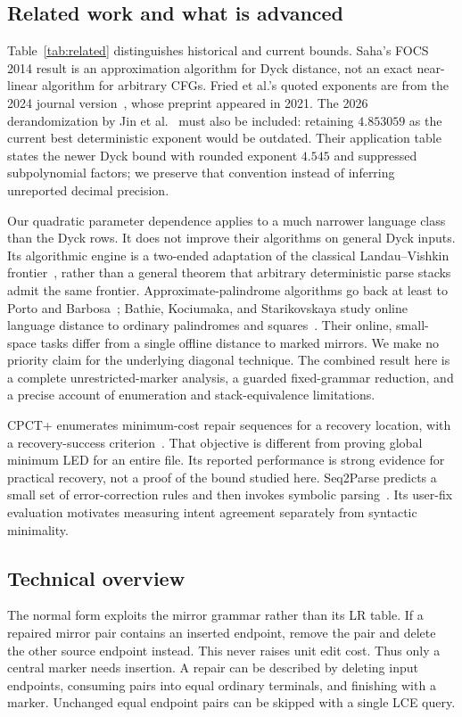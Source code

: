 \documentclass[sigconf,screen]{acmart}
\theoremstyle{definition}
\begin{document}
\subsection{Related work and what is advanced}
Table~\ref{tab:related} distinguishes historical and current bounds. Saha's FOCS 2014 result is an approximation algorithm for Dyck distance, not an exact near-linear algorithm for arbitrary CFGs. Fried et al.'s quoted exponents are from the 2024 journal version~\cite{fried2024}, whose preprint appeared in 2021. The 2026 derandomization by Jin et al.~\cite{jin2026} must also be included: retaining $4.853059$ as the current best deterministic exponent would be outdated. Their application table states the newer Dyck bound with rounded exponent $4.545$ and suppressed subpolynomial factors; we preserve that convention instead of inferring unreported decimal precision.

Our quadratic parameter dependence applies to a much narrower language class than the Dyck rows. It does not improve their algorithms on general Dyck inputs. Its algorithmic engine is a two-ended adaptation of the classical Landau--Vishkin frontier~\cite{landauvishkin1988}, rather than a general theorem that arbitrary deterministic parse stacks admit the same frontier. Approximate-palindrome algorithms go back at least to Porto and Barbosa~\cite{porto2003}; Bathie, Kociumaka, and Starikovskaya study online language distance to ordinary palindromes and squares~\cite{bathie2023}. Their online, small-space tasks differ from a single offline distance to marked mirrors. We make no priority claim for the underlying diagonal technique. The combined result here is a complete unrestricted-marker analysis, a guarded fixed-grammar reduction, and a precise account of enumeration and stack-equivalence limitations.

CPCT+ enumerates minimum-cost repair sequences for a recovery location, with a recovery-success criterion~\cite{cpct2020}. That objective is different from proving global minimum LED for an entire file. Its reported performance is strong evidence for practical recovery, not a proof of the bound studied here. Seq2Parse predicts a small set of error-correction rules and then invokes symbolic parsing~\cite{seq2parse2022}. Its user-fix evaluation motivates measuring intent agreement separately from syntactic minimality.

\subsection{Technical overview}
The normal form exploits the mirror grammar rather than its LR table. If a repaired mirror pair contains an inserted endpoint, remove the pair and delete the other source endpoint instead. This never raises unit edit cost. Thus only a central marker needs insertion. A repair can be described by deleting input endpoints, consuming pairs into equal ordinary terminals, and finishing with a marker. Unchanged equal endpoint pairs can be skipped with a single LCE query.
\end{document}

